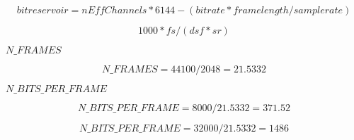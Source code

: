\documentclass{article}
\begin{document}
\[ bitreservoir = nEffChannels*6144 - (bitrate*framelength/samplerate) \]
\pagebreak

\[ 1000 * fs / (dsf * sr) \]
\pagebreak

$N\_FRAMES$
\pagebreak

\[ N\_FRAMES = 44100 / 2048 = 21.5332 \]
\pagebreak

$N\_BITS\_PER\_FRAME$
\pagebreak

\[ N\_BITS\_PER\_FRAME = 8000 / 21.5332 = 371.52 \]
\pagebreak

\[ N\_BITS\_PER\_FRAME = 32000 / 21.5332 = 1486 \]
\pagebreak
\end{document}
